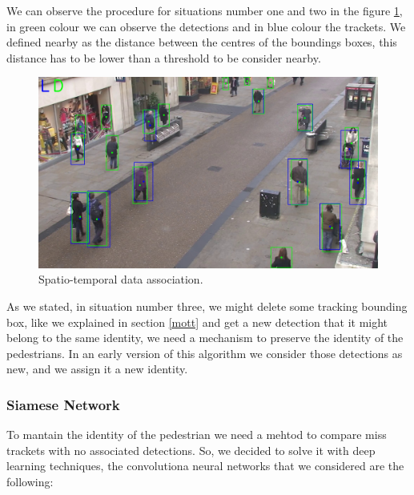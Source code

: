 \documentclass[12pt, a4paper, titlepage,twoside,openright]{article}
\begin{document}
We can observe the procedure for situations number one and two in the figure \ref{data1}, in green colour we can observe the detections and in blue colour the trackets. We defined nearby as the distance between the centres of the boundings boxes, this distance has to be lower than a threshold to be consider nearby. 

\begin{figure}[hptb]
\centering         
\includegraphics[width=12cm]{lucasKanade/dataAssociation.jpg}
\caption{Spatio-temporal data association.} \label{data1}
\end{figure}


As we stated, in situation number three, we might delete some tracking bounding box, like we explained in section \ref{mott} and get a new detection that it might belong to the same identity, we need a mechanism to preserve the identity of the pedestrians. In an early version of this algorithm we consider those detections as new, and we assign it a new identity.





\subsubsection{Siamese Network}


To mantain the identity of the pedestrian we need a mehtod to compare miss trackets with no associated detections. So, we decided to solve it with deep learning techniques, the convolutiona neural networks that we considered are the following:
\end{document}
